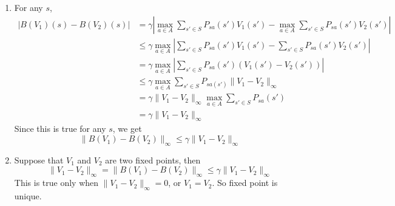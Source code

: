 
\begin{answer}
\begin{enumerate}
    \item 
        For any $s$,
$$
\begin{aligned}
|B(V_1)(s) - B(V_2)(s)| &= \gamma |\max_{a\in A} \sum_{s'\in S}P_{sa}(s')V_1(s') - \max_{a\in A} \sum_{s' \in S}P_{sa}(s') V_2(s')|\\
&\le \gamma \max_{a\in A}|\sum_{s'\in S}P_{sa}(s')V_1(s') - \sum_{s' \in S}P_{sa}(s')V_2(s')|\\
&= \gamma \max_{a\in A}|\sum_{s'\in S}P_{sa}(s')(V_1(s') - V_2(s'))|\\
&\le \gamma \max_{a\in A}\sum_{s'\in S}P_{sa(s')}\|V_1 - V_2\|_{\infty}\\
&= \gamma \|V_1 -V_2\|_\infty \max_{a\in A}\sum_{s'\in S}P_{sa}(s')\\
&= \gamma \|V_1 - V_2\|_{\infty}
\end{aligned}
$$
Since this is true for any $s$, we get
$$
\|B(V_1) - B(V_2)\|_\infty \le \gamma \|V_1 - V_2\|_\infty
$$

\item 

    Suppose that $V_1$ and $V_2$ are two fixed points, then
$$
\|V_1 - V_2\|_\infty = \|B(V_1) - B(V_2)\|_\infty \le \gamma \|V_1 - V_2\|_\infty
$$
This is true only when $\|V_1 - V_2\|_\infty = 0$, or $V_1 = V_2$. So fixed point is unique.






\end{enumerate}
\end{answer}
